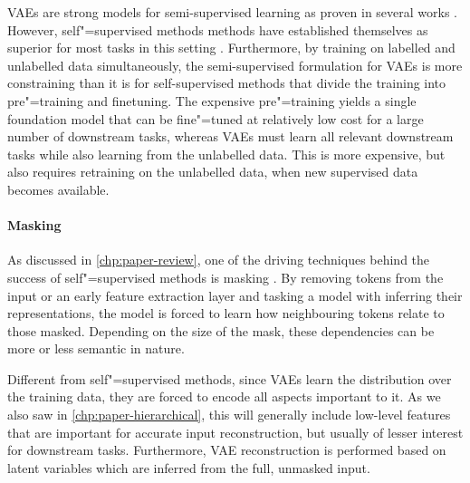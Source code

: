 VAEs are strong models for semi-supervised learning as proven in several works \parencite{kingma_semi-supervised_2014,kingma_improved_2016,maaloe_biva_2019}. 
However, self"=supervised methods methods have established themselves as superior for most tasks in this setting \cite{jiang_speech_2021, liu_learning_2023}. 
Furthermore, by training on labelled and unlabelled data simultaneously, the semi-supervised formulation for VAEs is more constraining than it is for self-supervised methods that divide the training into pre"=training and finetuning. The expensive pre"=training yields a single foundation model that can be fine"=tuned at relatively low cost for a large number of downstream tasks, whereas VAEs must learn all relevant downstream tasks while also learning from the unlabelled data. This is more expensive, but also requires retraining on the unlabelled data, when new supervised data becomes available. 

\paragraph{Masking} As discussed in \cref{chp:paper-review}, one of the driving techniques behind the success of self"=supervised methods is masking \parencite{devlin_bert_2018,baevski_wav2vec_2020}. By removing tokens from the input or an early feature extraction layer and tasking a model with inferring their representations, the model is forced to learn how neighbouring tokens relate to those masked. Depending on the size of the mask, these dependencies can be more or less semantic in nature. 

Different from self"=supervised methods, since VAEs learn the distribution over the training data, they are forced to encode all aspects important to it. 
As we also saw in \cref{chp:paper-hierarchical}, this will generally include low-level features that are important for accurate input reconstruction, but usually of lesser interest for downstream tasks. Furthermore, VAE reconstruction is performed based on latent variables which are inferred from the full, unmasked input. 

